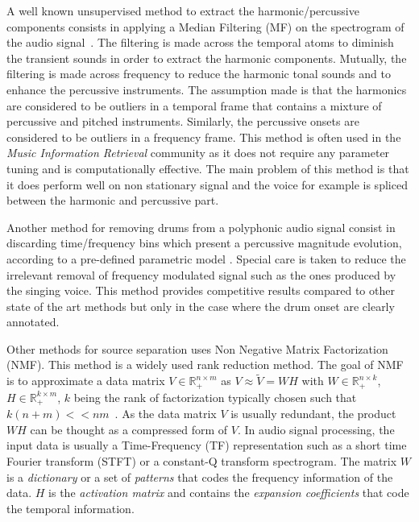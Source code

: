 A well known unsupervised method to extract the harmonic/percussive components consists in applying a Median Filtering (MF) on the spectrogram of the audio signal~\cite{fitzgerald2010harmonic}. The filtering is made across the temporal atoms to diminish the transient sounds in order to extract the harmonic components. Mutually, the filtering is made across frequency to reduce the harmonic tonal sounds and to enhance the percussive instruments. The assumption made is that the harmonics are considered to be outliers in a temporal frame that contains a mixture of percussive and pitched instruments. Similarly, the percussive onsets are considered to be outliers in a frequency frame. This method is often used in the \emph{Music Information Retrieval} community as it does not require any parameter tuning and is computationally effective. The main problem of this method is that it does perform well on non stationary signal and the voice for example is spliced between the harmonic and percussive part. 

Another method for removing drums from a polyphonic audio signal consist in discarding time/frequency bins which present a percussive magnitude evolution, according to a pre-defined parametric model \cite{rigaud2011drum}. Special care is taken to reduce the irrelevant removal of frequency modulated signal such as the ones produced by the singing voice. This method provides competitive results compared to other state of the art methods but only in the case where the drum onset are clearly annotated. 

Other methods for source separation uses Non Negative Matrix Factorization (NMF). This method is a widely used rank reduction method. The goal of NMF is to approximate a data matrix $V \in \mathbb{R}_{+}^{n \times m} $ as $V \approx \tilde{V} = WH$ with $W \in \mathbb{R}_{+}^{n \times k}$, $H \in \mathbb{R}_{+}^{k \times m}$, $k$ being the rank of factorization typically chosen such that \mbox{$k(n+m) << nm  $}~\cite{lee99}. As the data matrix $V$ is usually redundant, the product $WH$ can be thought as a compressed form of $V$. In audio signal processing, the input data is usually a Time-Frequency (TF) representation such as a short time Fourier transform (STFT) or a constant-Q transform spectrogram. The matrix $W$ is a {\em dictionary} or a set of {\em patterns} that codes the frequency information of the data. $H$ is the {\em activation matrix} and contains the {\em expansion coefficients} that code the temporal information.

